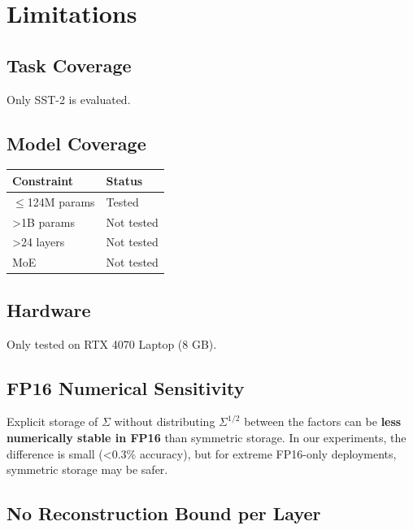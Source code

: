 
\section{Limitations}

\subsection{Task Coverage}

Only SST-2 is evaluated.

\subsection{Model Coverage}

\begin{table}[H]
\centering
\small
\begin{tabular}{ll}
\toprule
\textbf{Constraint} & \textbf{Status} \\
\midrule
$\le$124M params & Tested \\
\textgreater{}1B params & Not tested \\
\textgreater{}24 layers & Not tested \\
MoE & Not tested \\
\bottomrule
\end{tabular}
\end{table}

\subsection{Hardware}

Only tested on RTX 4070 Laptop (8 GB).

\subsection{FP16 Numerical Sensitivity}

Explicit storage of $\Sigma$ without distributing $\Sigma^{1/2}$ between 
the factors can be \textbf{less numerically stable in FP16} than symmetric 
storage. In our experiments, the difference is small (\textless{}0.3\% accuracy), 
but for extreme FP16-only deployments, symmetric storage may be safer.

\subsection{No Reconstruction Bound per Layer}

